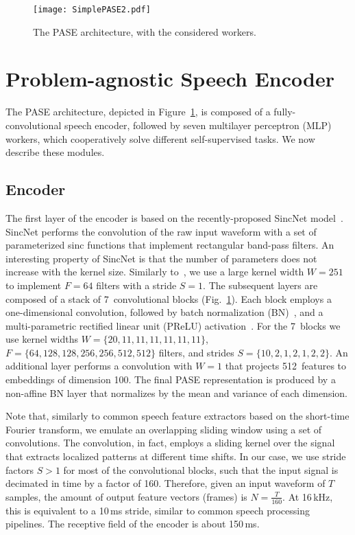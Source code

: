 \documentclass[a4paper]{article}
\begin{document}
\begin{figure}[t]
    \centering
    \texttt{[image: SimplePASE2.pdf]}
\caption{The PASE architecture, with the considered workers. }
    \label{fig:PASE}
\end{figure}




\section{Problem-agnostic Speech Encoder}
The PASE architecture, depicted in Figure~\ref{fig:PASE}, is composed of a fully-convolutional speech encoder, followed by seven multilayer perceptron (MLP) workers, which cooperatively solve different self-supervised tasks. We now describe these modules.


\subsection{Encoder}
\label{sec:architecture}


The first layer of the encoder is based on the recently-proposed SincNet model~\cite{ravanelli2018speaker}. SincNet performs the convolution of the raw input waveform with a set of parameterized sinc functions that implement rectangular band-pass filters. An interesting property of SincNet is that the number of parameters does not increase with the kernel size. Similarly to~\cite{ravanelli2018speaker,sincnet_irasl}, we use a large kernel width $W=251$ to implement $F=64$ filters with a stride $S=1$. 
The subsequent layers are composed of a stack of 7~convolutional blocks (Fig.~\ref{fig:PASE}). Each block employs a one-dimensional convolution, followed by batch normalization (BN)~\cite{batchnorm}, and a multi-parametric rectified linear unit (PReLU) activation~\cite{he2015delving}. For the 7~blocks we use kernel widths $W=\{20, 11, 11, 11, 11, 11, 11\}$, $F=\{64, 128, 128, 256, 256, 512, 512\}$ filters, and strides $S=\{10, 2, 1, 2, 1, 2, 2\}$. An additional layer performs a convolution with $W=1$ that projects 512~features to embeddings of dimension 100. The final PASE representation is produced by a non-affine BN layer that normalizes by the mean and variance of each dimension.

Note that, similarly to common speech feature extractors based on the short-time Fourier transform, we emulate an overlapping sliding window using a set of convolutions. The convolution, in fact, 
employs a sliding kernel over the signal that extracts localized patterns at different time shifts. 
In our case, we use stride factors $S > 1$ for most of the convolutional blocks, such that the input signal is decimated in time by a factor of 160. Therefore, given an input waveform of $T$ samples, the amount of output feature vectors (frames) is $N = \frac{T}{160}$. At 16\,kHz, this is equivalent to a 10\,ms stride, similar to common speech processing pipelines. The receptive field of the encoder is about 150\,ms. 
\end{document}
